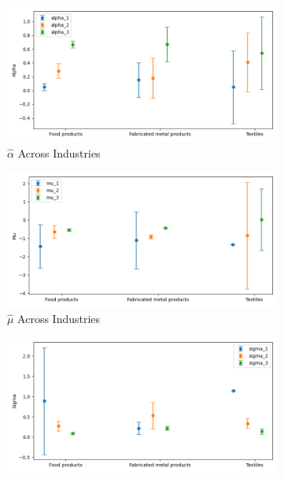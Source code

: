 \documentclass{article}
\begin{document}
\begin{figure}[ht!]
    \centering 
    \caption{AR(1) Normal Model with $\log K$, Import and CIIU Across Industries}
    \begin{subfigure}[t]{0.32\textwidth}
        \centering
        \includegraphics[width=\textwidth]{figure/ar1_normal_kmshare_ciiu_alpha_across_industries_m3.png}
        \caption{$\hat\alpha$ Across Industries}
    \end{subfigure}
    \begin{subfigure}[t]{0.32\textwidth}
        \centering
        \includegraphics[width=\textwidth]{figure/ar1_normal_kmshare_ciiu_mu_across_industries_m3.png}
        \caption{$\hat\mu$ Across Industries}
    \end{subfigure}
    \begin{subfigure}[t]{0.32\textwidth}
        \centering
        \includegraphics[width=\textwidth]{figure/ar1_normal_kmshare_ciiu_sigma_across_industries_m3.png}

\end{subfigure}
\end{figure}
\end{document}
